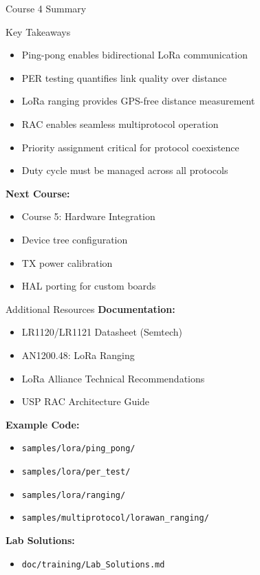 \documentclass{beamer}
\begin{document}
\begin{frame}{Course 4 Summary}
\begin{block}{Key Takeaways}
\begin{itemize}
    \item Ping-pong enables bidirectional LoRa communication
    \item PER testing quantifies link quality over distance
    \item LoRa ranging provides GPS-free distance measurement
    \item RAC enables seamless multiprotocol operation
    \item Priority assignment critical for protocol coexistence
    \item Duty cycle must be managed across all protocols
\end{itemize}
\end{block}

\vspace{0.5cm}

\textbf{Next Course:}
\begin{itemize}
    \item Course 5: Hardware Integration
    \item Device tree configuration
    \item TX power calibration
    \item HAL porting for custom boards
\end{itemize}
\end{frame}

\begin{frame}{Additional Resources}
\textbf{Documentation:}
\begin{itemize}
    \item LR1120/LR1121 Datasheet (Semtech)
    \item AN1200.48: LoRa Ranging
    \item LoRa Alliance Technical Recommendations
    \item USP RAC Architecture Guide
\end{itemize}

\vspace{0.3cm}

\textbf{Example Code:}
\begin{itemize}
    \item \texttt{samples/lora/ping\_pong/}
    \item \texttt{samples/lora/per\_test/}
    \item \texttt{samples/lora/ranging/}
    \item \texttt{samples/multiprotocol/lorawan\_ranging/}
\end{itemize}

\vspace{0.3cm}

\textbf{Lab Solutions:}
\begin{itemize}
    \item \texttt{doc/training/Lab\_Solutions.md}
\end{itemize}
\end{frame}
\end{document}
